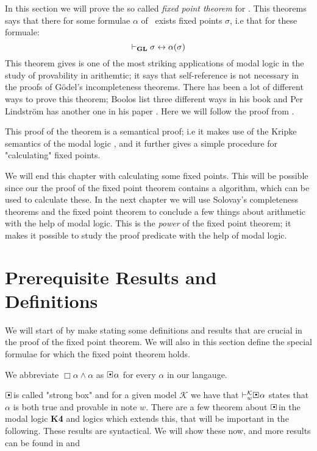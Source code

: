 \documentclass[../main.tex]{subfiles}
\begin{document}
In this section we will prove the so called \textit{fixed point theorem} for
\GL.  This theorems says that there for some formulae $\alpha$  of \GL\ exists fixed
points $\sigma$, i.e that for these formuale:
\[\vdash_{\text{\textbf{GL}}}\sigma\leftrightarrow\alpha(\sigma)\]
This theorem gives is one of the most striking applications of modal logic in
the study of provability in arithemtic; it says that self-reference is not
necessary in the proofs of Gödel's incompleteness theorems.
There has been a lot of different ways to prove this theorem; Boolos
list three different ways in his book \parencite{Boolos1993} and Per Lindström has
another one in his paper \parencite{Lind1996}. Here we
will follow the proof from \parencite{Olson1990}.

This proof of the theorem is a semantical proof; i.e it makes use of the
Kripke semantics of the modal logic \GL, and it further gives a simple
procedure for "calculating" fixed points.

We will end this chapter with calculating some fixed points. This will be
possible since our the proof of the fixed point theorem contains a algorithm,
which can be used to calculate these. In the next chapter we will use Solovay's
completeness theorems and the fixed point theorem to conclude a few things
about arithmetic with the help of modal logic. This is the \textit{power} of
the fixed point theorem; it makes it possible to study the proof predicate with
the help of modal logic.

\section{Prerequisite Results and Definitions}

We will start of by make stating some definitions and results that are crucial
in the proof of the fixed point theorem. We will also in this section define
the special formulae for which the fixed point theorem holds.

\begin{defi}
	We abbreviate $\Box\alpha\wedge\alpha$ as $\sBox\alpha$ for every
	$\alpha$ in our langauge.
\end{defi}
$\sBox$ is called "strong box" and for a given model $\mathcal{K}$ we have that
$\vdash_w^\mathcal{K}\sBox \alpha$ states that $\alpha$ is both true and
provable in note $w$. There are a few theorem about $\sBox$ in the modal logic
\textbf{K4} and logics which extends this, that will be
important in the following. These results are syntactical. We will show these
now, and more results can be found in \parencite{Smor1985} and \cite{Boolos1993}
\end{document}
